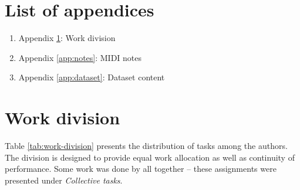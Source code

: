 \documentclass[a4paper, 11pt, twoside]{report}
\renewcommand*{\thetable}{\arabic{chapter}.\arabic{table}}
\theoremstyle{definition}
\begin{document}
\newpage


{}
\listoffigures

\newpage


\renewcommand{\listtablename}{List of tables}
{}
\listoftables

\newpage


\chapter*{List of appendices}

\begin{enumerate}
    \item Appendix \ref{app:work}: Work division
    \item Appendix \ref{app:notes}: MIDI notes
    \item Appendix \ref{app:dataset}: Dataset content
\end{enumerate}

\newpage


\appendix
\setcounter{table}{0}
\renewcommand{\thetable}{A.\arabic{table}}

\chapter{Work division} \label{app:work}

Table \ref{tab:work-division} presents the distribution of tasks among the authors. The division is designed to provide equal work allocation as well as continuity of performance. Some work was done by all together -- these assignments were presented under \textit{Collective tasks}. \par

\vfill
\end{document}
